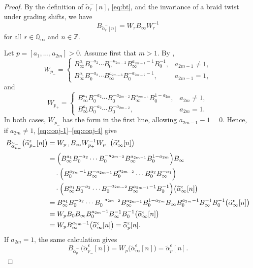\documentclass[11pt,a4paper,reqno]{amsart}%
\theoremstyle{plain}
\theoremstyle{definition}
\numberwithin{equation}{section}
\numberwithin{equation}{section}
\def\ZZ{\mathbb{Z}}
\newcommand{\QQi}{\mathbb{Q}_\infty}
\begin{document}
\begin{proof}
By the definition of $\widetilde{\alpha}_r^-[n]$, \eqref{eq:bt}, and the
invariance of a braid twist under grading shifts, we have
\[
B_{\widetilde{\alpha}_r^-[n]}
=W_rB_\infty W_r^{-1}
\]
for all $r\in\QQi$ and $n\in\ZZ$.

Let $p=[a_1,\ldots,a_{2m}]>0$. Assume first that $m>1$. By
,
\[
W_{p_-}=
\begin{cases}
B_\infty^{a_1}B_0^{-a_2}\cdots B_0^{-a_{2m-2}}
B_\infty^{a_{2m-1}-1}B_0^{-1},&a_{2m-1}\ne1,\\
B_\infty^{a_1}B_0^{-a_2}\cdots
B_\infty^{a_{2m-3}}B_0^{-a_{2m-2}-1},&a_{2m-1}=1,
\end{cases}
\]
and
\[
W_{p_+}=
\begin{cases}
B_\infty^{a_1}B_0^{-a_2}\cdots B_0^{-a_{2m-2}}
B_\infty^{a_{2m-1}}B_0^{1-a_{2m}},&a_{2m}\ne1,\\
B_\infty^{a_1}B_0^{-a_2}\cdots B_0^{-a_{2m-2}},&a_{2m}=1.
\end{cases}
\]
In both cases, $W_{p_-}$ has the form in the first line, allowing
$a_{2m-1}-1=0$. Hence, if
$a_{2m}\ne1$, \eqref{eq:conj-1}--\eqref{eq:conj-4} give
\[
\begin{aligned}
B_{\widetilde{\alpha}_{p_+}^{-}}
\bigl(\widetilde{\alpha}_{p_-}^\epsilon[n]\bigr)
&=W_{p_+}B_\infty W_{p_+}^{-1}W_{p_-}
  \bigl(\widetilde{\alpha}_\infty^\epsilon[n]\bigr)\\
&=\Bigl(B_\infty^{a_1}B_0^{-a_2}\cdots B_0^{-a_{2m-2}}
  B_\infty^{a_{2m-1}}B_0^{1-a_{2m}}\Bigr)B_\infty\\
&\quad\cdot\Bigl(B_0^{a_{2m}-1}B_\infty^{-a_{2m-1}}
  B_0^{a_{2m-2}}\cdots B_0^{a_2}B_\infty^{-a_1}\Bigr)\\
&\quad\cdot\Bigl(B_\infty^{a_1}B_0^{-a_2}\cdots B_0^{-a_{2m-2}}
  B_\infty^{a_{2m-1}-1}B_0^{-1}\Bigr)
  \bigl(\widetilde{\alpha}_\infty^\epsilon[n]\bigr)\\
&=B_\infty^{a_1}B_0^{-a_2}\cdots B_0^{-a_{2m-2}}
  B_\infty^{a_{2m-1}}B_0^{1-a_{2m}}B_\infty
  B_0^{a_{2m}-1}B_\infty^{-1}B_0^{-1}
  \bigl(\widetilde{\alpha}_\infty^\epsilon[n]\bigr)\\
&=W_pB_0B_\infty B_0^{a_{2m}-1}B_\infty^{-1}B_0^{-1}
  \bigl(\widetilde{\alpha}_\infty^\epsilon[n]\bigr)\\
&=W_pB_\infty^{a_{2m}-1}
  \bigl(\widetilde{\alpha}_\infty^\epsilon[n]\bigr)
=\widetilde{\alpha}_p^\epsilon[n].
\end{aligned}
\]
If $a_{2m}=1$, the same calculation gives
\[
B_{\widetilde{\alpha}_{p_+}^{-}}
\bigl(\widetilde{\alpha}_{p_-}^\epsilon[n]\bigr)
=W_p\bigl(\widetilde{\alpha}_\infty^\epsilon[n]\bigr)
=\widetilde{\alpha}_p^\epsilon[n].
\]


\end{proof}
\end{document}
